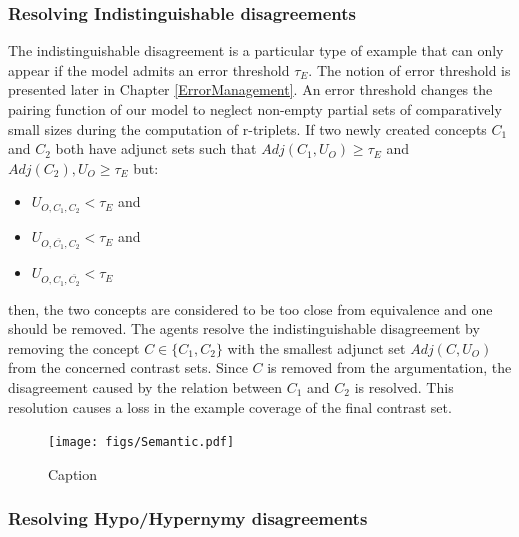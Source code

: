 \subsubsection{Resolving Indistinguishable disagreements}

The indistinguishable disagreement is a particular type of example that can only appear if the model admits an error threshold $\tau_{E}$. The notion of error threshold is presented later in Chapter \ref{ErrorManagement}. An error threshold changes the pairing function of our model to neglect non-empty partial sets of comparatively small sizes during the computation of r-triplets. If two newly created concepts $C_{1}$ and $C_{2}$ both have adjunct sets such that $Adj(C_{1}, U_{O}) \geq \tau_{E}$ and $Adj(C_{2}), U_{O} \geq \tau_{E}$ but:

\begin{itemize}
    \item $U_{O,C_{1},C_{2}} < \tau_{E}$ and
    \item $U_{O,\overbar{C_{1}},C_{2}} < \tau_{E}$ and
    \item $U_{O,C_{1},\overbar{C_{2}}} < \tau_{E}$
\end{itemize}

then, the two concepts are considered to be too close from equivalence and one should be removed. The agents resolve the indistinguishable disagreement by removing the concept $C \in \{C_{1}, C_{2}\}$ with the smallest adjunct set $Adj(C, U_{O})$ from the concerned contrast sets. Since $C$ is removed from the argumentation, the disagreement caused by the relation between $C_{1}$ and $C_{2}$ is resolved. This resolution causes a loss in the example coverage of the final contrast set.

\begin{figure}[t]
    \centering
    \texttt{[image: figs/Semantic.pdf]}
    \caption{Caption}
    \label{fig:SolveSemantic}
\end{figure}

\subsubsection{Resolving Hypo/Hypernymy disagreements}

